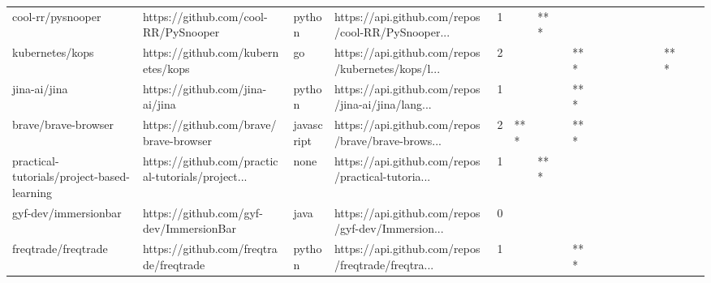 \begin{tabular}{llllrlllllllllllll}
cool-rr/pysnooper                                  &               https://github.com/cool-RR/PySnooper &            python &  https://api.github.com/repos/cool-RR/PySnooper... &       1 &         &    *** &           &                &                 &        &           &           &          &          &       &              &          \\
kubernetes/kops                                    &                 https://github.com/kubernetes/kops &                go &  https://api.github.com/repos/kubernetes/kops/l... &       2 &         &        &           &            *** &                 &        &           &           &          &          &   *** &              &          \\
jina-ai/jina                                       &                    https://github.com/jina-ai/jina &            python &  https://api.github.com/repos/jina-ai/jina/lang... &       1 &         &        &           &            *** &                 &        &           &           &          &          &       &              &          \\
brave/brave-browser                                &             https://github.com/brave/brave-browser &        javascript &  https://api.github.com/repos/brave/brave-brows... &       2 &     *** &        &           &            *** &                 &        &           &           &          &          &       &              &          \\
practical-tutorials/project-based-learning         &  https://github.com/practical-tutorials/project... &              none &  https://api.github.com/repos/practical-tutoria... &       1 &         &    *** &           &                &                 &        &           &           &          &          &       &              &          \\
gyf-dev/immersionbar                               &            https://github.com/gyf-dev/ImmersionBar &              java &  https://api.github.com/repos/gyf-dev/Immersion... &       0 &         &        &           &                &                 &        &           &           &          &          &       &              &          \\
freqtrade/freqtrade                                &             https://github.com/freqtrade/freqtrade &            python &  https://api.github.com/repos/freqtrade/freqtra... &       1 &         &        &           &            *** &                 &        &           &           &          &          &       &              &          \\

\end{tabular}
